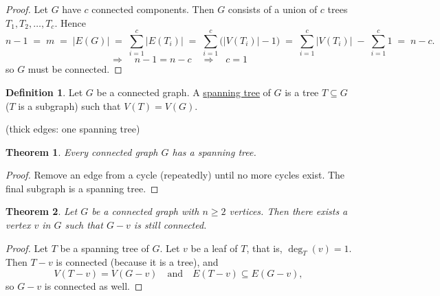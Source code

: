 \documentclass[11pt]{article}
\newtheorem{theorem}{Theorem}
\theoremstyle{definition}
\newtheorem*{definition*}{Definition}
\begin{document}
\begin{proof}
Let $G$ have $c$ connected components. Then $G$ consists of a union of $c$
trees $T_1, T_2, \dots, T_c$. Hence
\[
  n-1 \;=\; m \;=\; |E(G)|
  \;=\; \sum_{i=1}^{c} |E(T_i)|
  \;=\; \sum_{i=1}^{c} \bigl(|V(T_i)| - 1\bigr)
  \;=\; \sum_{i=1}^{c} |V(T_i)| \;-\; \sum_{i=1}^{c} 1
  \;=\; n - c .
\]
\[
  \Longrightarrow\quad n-1 = n-c \quad\Longrightarrow\quad \boxed{c = 1}
\]
so $G$ must be connected.
\end{proof}

\bigskip

\begin{definition*}
Let $G$ be a connected graph. A \underline{spanning tree} of $G$ is a tree
$T \subseteq G$ ($T$ is a subgraph) such that $V(T) = V(G)$.
\end{definition*}

\begin{center}

\small (thick edges: one spanning tree)
\end{center}

\begin{theorem}
Every connected graph $G$ has a spanning tree.
\end{theorem}

\begin{proof}
Remove an edge from a cycle (repeatedly) until no more cycles exist. The
final subgraph is a spanning tree.
\end{proof}

\begin{theorem}
Let $G$ be a connected graph with $n \ge 2$ vertices. Then there exists a
vertex $v$ in $G$ such that $G - v$ is still connected.
\end{theorem}

\begin{proof}
Let $T$ be a spanning tree of $G$. Let $v$ be a leaf of $T$, that is,
$\deg_T(v) = 1$. Then $T - v$ is connected (because it is a tree), and
\[
  V(T-v) = V(G-v) \quad\text{and}\quad E(T-v) \subseteq E(G-v),
\]
so $G - v$ is connected as well.
\end{proof}
\end{document}
